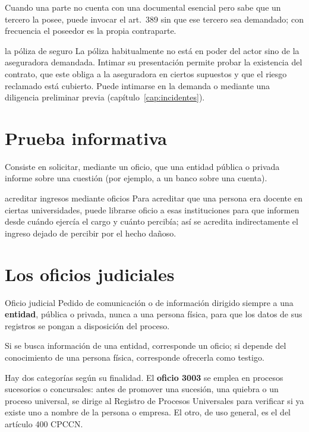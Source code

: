 \documentclass[12pt,oneside]{book}
\begin{document}
Cuando una parte no cuenta con una documental esencial pero sabe que un tercero la posee, puede invocar el art.~389 sin que ese tercero sea demandado; con frecuencia el poseedor es la propia contraparte.

\begin{ejemplo}{la póliza de seguro}
La póliza habitualmente no está en poder del actor sino de la aseguradora demandada. Intimar su presentación permite probar la existencia del contrato, que este obliga a la aseguradora en ciertos supuestos y que el riesgo reclamado está cubierto. Puede intimarse en la demanda o mediante una diligencia preliminar previa (capítulo~\ref{cap:incidentes}).
\end{ejemplo}

\section{Prueba informativa}

Consiste en solicitar, mediante un oficio, que una entidad pública o privada informe sobre una cuestión (por ejemplo, a un banco sobre una cuenta).

\begin{ejemplo}{acreditar ingresos mediante oficios}
Para acreditar que una persona era docente en ciertas universidades, puede librarse oficio a esas instituciones para que informen desde cuándo ejercía el cargo y cuánto percibía; así se acredita indirectamente el ingreso dejado de percibir por el hecho dañoso.
\end{ejemplo}

\section{Los oficios judiciales}\label{sec:oficios}

\begin{definicion}{Oficio judicial}
Pedido de comunicación o de información dirigido siempre a una \textbf{entidad}, pública o privada, nunca a una persona física, para que los datos de sus registros se pongan a disposición del proceso.
\end{definicion}

\begin{nota}
Si se busca información de una entidad, corresponde un oficio; si depende del conocimiento de una persona física, corresponde ofrecerla como testigo.
\end{nota}

Hay dos categorías según su finalidad. El \textbf{oficio 3003} se emplea en procesos sucesorios o concursales: antes de promover una sucesión, una quiebra o un proceso universal, se dirige al Registro de Procesos Universales para verificar si ya existe uno a nombre de la persona o empresa. El otro, de uso general, es el del artículo 400 CPCCN.
\end{document}
